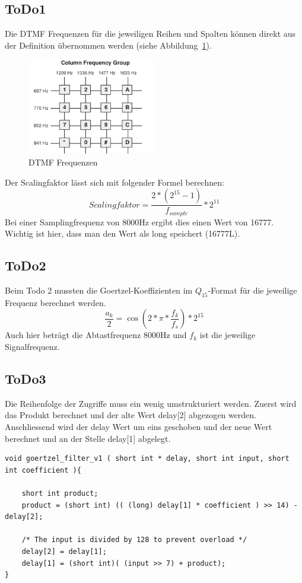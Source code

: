\documentclass[a4paper,11pt]{article}
\begin{document}
\subsection{ToDo1}
Die DTMF Frequenzen für die jeweiligen Reihen und Spalten können direkt aus der Definition übernommen werden (siehe Abbildung~\ref{fig:DTMF_freq}).
\begin{figure}[h!]
\centering
\includegraphics[width=0.5\textwidth]{DTMF_freq}
\caption{DTMF Frequenzen}
\label{fig:DTMF_freq}
\end{figure}
\newline
Der Scalingfaktor lässt sich mit folgender Formel berechnen:
\begin{equation}\label{eq:Scalingfakt}
	Scalingfaktor = \frac{2*(2^{15}-1)}{f_{sample}}*2^{11}
\end{equation}
Bei einer Samplingfrequenz von 8000Hz ergibt dies einen Wert von 16777. Wichtig ist hier, dass man den Wert als long speichert (16777L). 

\subsection{ToDo2}
Beim Todo 2 mussten die Goertzel-Koeffizienten im $Q_{15}$-Format für die jeweilige Frequenz berechnet werden.
\begin{equation}\label{eq:Goertzel_Koeff}
	\frac{a_k}{2}= \cos(2*\pi*\frac{f_k}{f_s})*2^{15}
\end{equation}
Auch hier beträgt die Abtastfrequenz 8000Hz und $f_k$ ist die jeweilige Signalfrequenz.

\subsection{ToDo3}
Die Reihenfolge der Zugriffe muss ein wenig umstrukturiert werden. Zuerst wird das Produkt berechnet und der alte Wert delay[2] abgezogen werden. Anschliessend wird der delay Wert um eins geschoben und der neue Wert berechnet und an der Stelle delay[1] abgelegt. 
\begin{lstlisting}
void goertzel_filter_v1 ( short int * delay, short int input, short int coefficient ){
	
	short int product;
	product = (short int) (( (long) delay[1] * coefficient ) >> 14) - delay[2];

	/* The input is divided by 128 to prevent overload */
	delay[2] = delay[1];
	delay[1] = (short int)( (input >> 7) + product);
}
\end{lstlisting}
\end{document}
